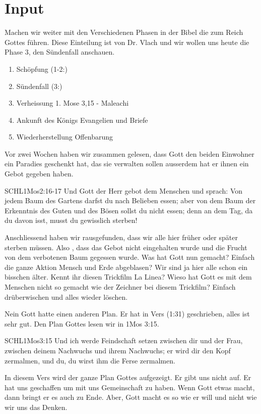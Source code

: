 \documentclass{../../inc/mybib}
\begin{document}
\section{ Input }
\begin{spacing}{1.5}    
    \begin{block}[Einleitung]
        Machen wir weiter mit den Verschiedenen Phasen in der Bibel die zum Reich Gottes führen. Diese Einteilung ist von Dr. Vlach und wir wollen uns heute die Phase 3, den Sündenfall anschauen.
    \end{block}

    \begin{enumerate}
    \item Schöpfung  (1-2:)
    \item Sündenfall  (3:)
    \item Verheissung 1. Mose 3,15 - Maleachi
    \item Ankunft des Königs Evangelien und Briefe
    \item Wiederherstellung Offenbarung
   \end{enumerate}        
    \begin{block}
       Vor zwei Wochen haben wir zusammen gelesen, dass Gott den beiden Einwohner ein Paradies geschenkt hat, das sie verwalten sollen ausserdem hat er ihnen ein Gebot gegeben haben.
       \begin{bibelbox}{SCHL}{1Mos}{2:16-17}
            Und Gott der Herr gebot dem Menschen und sprach: \flqq Von jedem Baum des Gartens darfst du nach Belieben essen; aber von dem Baum der Erkenntnis des Guten und des Bösen sollst du nicht essen; denn an dem Tag, da du davon isst, musst du gewisslich sterben!\frqq
        \end{bibelbox}
        Anschliessend haben wir rausgefunden, dass wir alle hier früher oder später sterben müssen.
        Also , dass das Gebot nicht eingehalten wurde und die Frucht von dem verbotenen Baum gegessen wurde.
        Was hat Gott nun gemacht? Einfach die ganze Aktion Mensch und Erde abgeblasen?
        Wir sind ja hier alle schon ein bisschen älter. Kennt ihr diesen Trickfilm La Linea? Wieso hat Gott es mit dem Menschen nicht so gemacht wie der Zeichner bei diesem Trickfilm? Einfach drüberwischen und alles wieder löschen.

        Nein Gott hatte einen anderen Plan. Er hat in Vers  (1:31) geschrieben, alles ist sehr gut.  Den Plan Gottes lesen wir in 1Mos 3:15. 
        \begin{bibelbox}{SCHL}{1Mos}{3:15}
            Und ich werde Feindschaft setzen zwischen dir und der Frau, zwischen deinem Nachwuchs und ihrem Nachwuchs; er wird dir den Kopf zermalmen, und du, du wirst ihm die Ferse zermalmen.
        \end{bibelbox}
        In diesem Vers wird der ganze Plan Gottes aufgezeigt. Er gibt uns nicht auf. Er hat uns geschaffen um mit uns Gemeinschaft zu haben. Wenn Gott etwas macht, dann bringt er es auch zu Ende. Aber, Gott macht es so wie er will und nicht wie wir uns das Denken.


\end{block}
\end{spacing}
\end{document}
